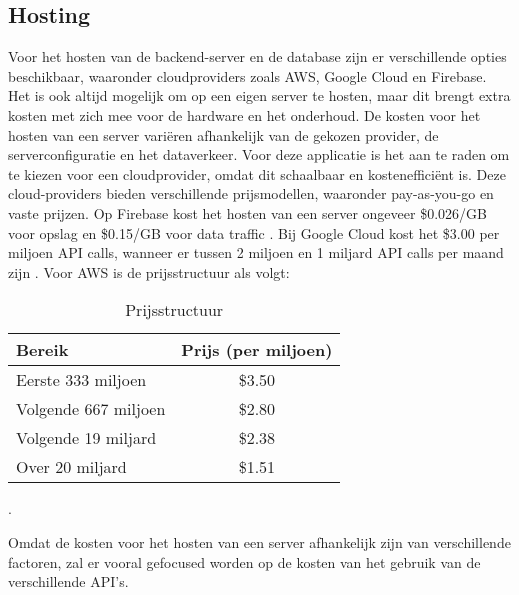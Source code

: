     \subsection{Hosting}

    Voor het hosten van de backend-server en de database zijn er verschillende opties beschikbaar, waaronder cloudproviders zoals AWS, Google Cloud en Firebase.
    Het is ook altijd mogelijk om op een eigen server te hosten, maar dit brengt extra kosten met zich mee voor de hardware en het onderhoud.
    De kosten voor het hosten van een server variëren afhankelijk van de gekozen provider, de serverconfiguratie en het dataverkeer.
    Voor deze applicatie is het aan te raden om te kiezen voor een cloudprovider, omdat dit schaalbaar en kostenefficiënt is.
    Deze cloud-providers bieden verschillende prijsmodellen, waaronder pay-as-you-go en vaste prijzen.
    Op Firebase kost het hosten van een server ongeveer \$0.026/GB voor opslag en \$0.15/GB voor data traffic \textcite{firebase_docs}.
    Bij Google Cloud kost het \$3.00 per miljoen API calls, wanneer er tussen 2 miljoen  en 1 miljard API calls per maand zijn \textcite{google_cloud_docs}.
    Voor AWS is de prijsstructuur als volgt:
    \begin{table}[h]
        \centering
        \begin{tabular}{lc}
        \toprule
        \textbf{Bereik} & \textbf{Prijs (per miljoen)} \\
        \midrule
        Eerste 333 miljoen & \$3.50 \\
        Volgende 667 miljoen & \$2.80 \\
        Volgende 19 miljard & \$2.38 \\
        Over 20 miljard & \$1.51 \\
        \bottomrule
        \end{tabular}
        \caption{Prijsstructuur}
        \label{tab:prijsstructuur}
    \end{table}
    \textcite{aws_docs}.

    Omdat de kosten voor het hosten van een server afhankelijk zijn van verschillende factoren, zal er vooral gefocused worden op de kosten van het gebruik van de verschillende API's.





